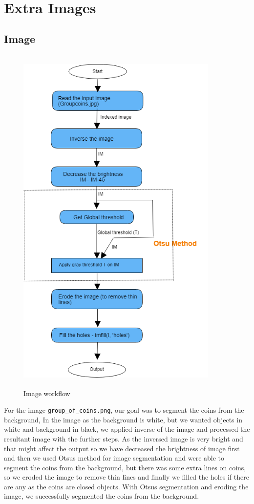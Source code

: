 \section{Extra Images}
\subsection{Image }
\begin{figure}[h!]
  \centering
  \includegraphics[width=10cm,height=18cm,keepaspectratio]{img/grp_of_coins_flow.png}
  \caption{Image  workflow}
\end{figure}

For the image \texttt{group\_of\_coins.png}, our goal was to segment the coins from the background, In the image as the background is white, but we wanted objects in white and background in black, we applied inverse of the image and processed the resultant image with the further steps. As the inversed image is very bright and that might affect the output so we have decreased the brightness of image first and then we used Otsus method for image segmentation and were able to segment the coins from the background, but there was some extra lines on coins, so we eroded the image to remove thin lines and finally we filled the holes if there are any as the coins are closed objects. With Otsus segmentation and eroding the image, we successfully segmented the coins from the background.

